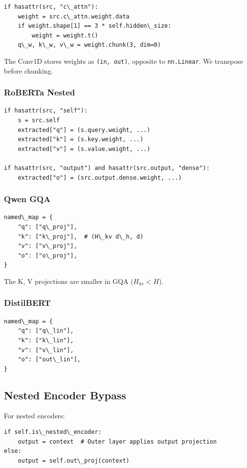 \begin{lstlisting}
if hasattr(src, "c\_attn"):
    weight = src.c\_attn.weight.data
    if weight.shape[1] == 3 * self.hidden\_size:
        weight = weight.t()
    q\_w, k\_w, v\_w = weight.chunk(3, dim=0)
\end{lstlisting}

The Conv1D stores weights as \texttt{(in, out)}, opposite to \texttt{nn.Linear}. We 
transpose before chunking.

\subsubsection{RoBERTa Nested}

\begin{lstlisting}
if hasattr(src, "self"):
    s = src.self
    extracted["q"] = (s.query.weight, ...)
    extracted["k"] = (s.key.weight, ...)
    extracted["v"] = (s.value.weight, ...)

if hasattr(src, "output") and hasattr(src.output, "dense"):
    extracted["o"] = (src.output.dense.weight, ...)
\end{lstlisting}

\subsubsection{Qwen GQA}

\begin{lstlisting}
named\_map = {
    "q": ["q\_proj"],
    "k": ["k\_proj"],  # (H\_kv d\_h, d)
    "v": ["v\_proj"],
    "o": ["o\_proj"],
}
\end{lstlisting}

The K, V projections are smaller in GQA ($H_{kv} < H$).

\subsubsection{DistilBERT}

\begin{lstlisting}
named\_map = {
    "q": ["q\_lin"],
    "k": ["k\_lin"],
    "v": ["v\_lin"],
    "o": ["out\_lin"],
}
\end{lstlisting}

\subsection{Nested Encoder Bypass}

For nested encoders:

\begin{lstlisting}
if self.is\_nested\_encoder:
    output = context  # Outer layer applies output projection
else:
    output = self.out\_proj(context)
\end{lstlisting}

